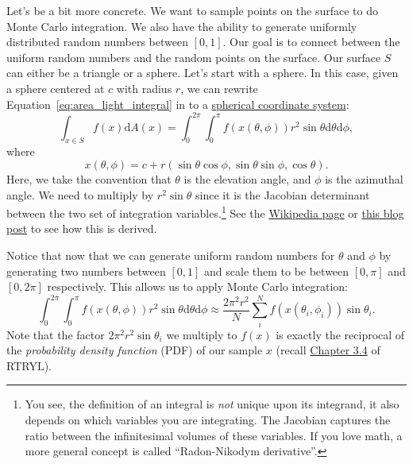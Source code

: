 Let's be a bit more concrete. We want to sample points on the surface to do Monte Carlo integration.
We also have the ability to generate uniformly distributed random numbers between $[0, 1]$. Our goal is to connect between the uniform random numbers and the random points on the surface.
Our surface $S$ can either be a triangle or a sphere. Let's start with a sphere. In this case, given a sphere centered at $c$ with radius $r$, we can rewrite Equation~\eqref{eq:area_light_integral} in to a \href{https://en.wikipedia.org/wiki/Spherical_coordinate_system}{spherical coordinate system}:
\begin{equation}
	\int_{x \in S} f(x) \mathrm{d}A(x) = \int_{0}^{2\pi}\int_{0}^{\pi} f(x(\theta, \phi)) r^2 \sin\theta \mathrm{d}\theta \mathrm{d} \phi,
	\label{eq:area_light_spherical}
\end{equation}
where
\begin{equation}
	x(\theta, \phi) = c + r \left(\sin\theta \cos\phi, \sin\theta \sin\phi, \cos\theta \right).
\end{equation}
Here, we take the convention that $\theta$ is the elevation angle, and $\phi$ is the azimuthal angle. We need to multiply by $r^2 \sin\theta$ since it is the Jacobian determinant between the two set of integration variables.\footnote{You see, the definition of an integral is \emph{not} unique upon its integrand, it also depends on which variables you are integrating. The Jacobian captures the ratio between the infinitesimal volumes of these variables. If you love math, a more general concept is called ``Radon-Nikodym derivative''.} See the \href{https://en.wikipedia.org/wiki/Spherical_coordinate_system#Integration_and_differentiation_in_spherical_coordinates}{Wikipedia page} or \href{http://6degreesoffreedom.co/circle-random-sampling/}{this blog post} to see how this is derived.

Notice that now that we can generate uniform random numbers for $\theta$ and $\phi$ by generating two numbers between $[0, 1]$ and scale them to be between $[0, \pi]$ and $[0, 2\pi]$ respectively. This allows us to apply Monte Carlo integration:
\begin{equation}
	\int_{0}^{2\pi}\int_{0}^{\pi} f(x(\theta, \phi)) r^2 \sin\theta \mathrm{d}\theta \mathrm{d} \phi
	\approx \frac{2\pi^2 r^2}{N} \sum_i^N f(x(\theta_i, \phi_i))\sin\theta_i.
	\label{eq:naive_monte_carlo_sphere}
\end{equation}
Note that the factor $2\pi^2 r^2 \sin\theta_i$ we multiply to $f(x)$ is exactly the reciprocal of the \emph{probability density function} (PDF) of our sample $x$ (recall \href{https://raytracing.github.io/books/RayTracingTheRestOfYourLife.html#onedimensionalmcintegration/importancesampling}{Chapter 3.4} of RTRYL). 

